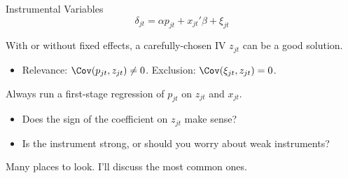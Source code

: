 \documentclass[aspectratio=169,t,11pt,table]{beamer}
\begin{document}
\begin{frame}{Instrumental Variables}
    \vspace{-\baselineskip}
    \begin{equation*}
        \delta_{jt} = \alpha p_{jt} + x_{jt}'\beta + \xi_{jt}
    \end{equation*}
    \vspace{-0.5\baselineskip}
    \begin{wideitemize}
        \item With or without fixed effects, a carefully-chosen IV $z_{jt}$ can be a good solution.
        \begin{itemize}
            \item Relevance: $\Cov(p_{jt}, z_{jt}) \neq 0$. Exclusion: $\Cov(\xi_{jt}, z_{jt}) = 0$.
        \end{itemize}
        \pause
        \item Always run a first-stage regression of $p_{jt}$ on $z_{jt}$ and $x_{jt}$.
        \begin{itemize}
            \item Does the sign of the coefficient on $z_{jt}$ make sense?
            \item Is the instrument strong, or should you worry about weak instruments?
        \end{itemize}
        \pause
        \item Many places to look. I'll discuss the most common ones.
    \end{wideitemize}
\end{frame}
\end{document}
